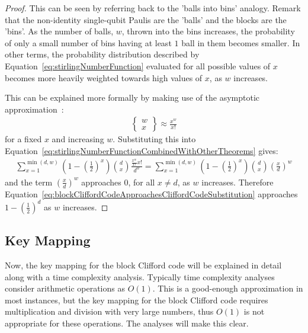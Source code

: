 \begin{proof}
This can be seen by referring back to the 'balls into bins' analogy. Remark that the non-identity single-qubit Paulis are the 'balls' and the blocks are the 'bins'. As the number of balls, $w$, thrown into the bins increases, the probability of only a small number of bins having at least $1$ ball in them becomes smaller. In other terms, the probability distribution described by Equation~\eqref{eq:stirlingNumberFunction} evaluated for all possible values of $x$ becomes more heavily weighted towards high values of $x$, as $w$ increases.

This can be explained more formally by making use of the asymptotic approximation~\cite{stirlingSecondKindApproximation}:
\begin{align}
\left\{\begin{smallmatrix}w\\x\end{smallmatrix}\right\} \approx \frac{x^w}{x!}
\end{align}
for a fixed $x$ and increasing $w$. Substituting this into Equation~\eqref{eq:stirlingNumberFunctionCombinedWithOtherTheorems} gives:
\begin{align}
\sum_{x=1} ^{\min(d,w)} \left(1-\left(\frac{1}{2}\right)^{x}\right) {d \choose x} \frac{\frac{x^w}{x!}x!}{d^w} = \sum_{x=1} ^{\min(d,w)} \left(1-\left(\frac{1}{2}\right)^{x}\right) {d \choose x} \left(\frac{x}{d}\right)^w \label{eq:blockCliffordCodeApproachesCliffordCodeSubstitution}
\end{align}
and the term $\left(\frac{x}{d}\right)^w$ approaches $0$, for all $x \neq d$, as $w$ increases. Therefore Equation~\eqref{eq:blockCliffordCodeApproachesCliffordCodeSubstitution} approaches $1 - \left(\frac{1}{2}\right)^d$ as $w$ increases.
\end{proof}

\subsection{Key Mapping}
\label{subsubsection:keyMappings}
Now, the key mapping for the block Clifford code will be explained in detail along with a time complexity analysis. Typically time complexity analyses consider arithmetic operations as $O\left(1\right)$. This is a good-enough approximation in most instances, but the key mapping for the block Clifford code requires multiplication and division with very large numbers, thus $O\left(1\right)$ is not appropriate for these operations. The analyses will make this clear. 

